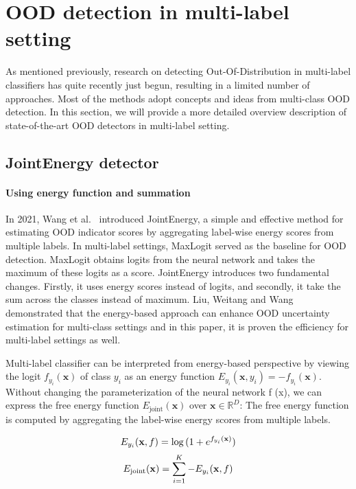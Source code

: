 \section{OOD detection in multi-label setting}
As mentioned previously, research on detecting Out-Of-Distribution in multi-label classifiers has quite recently just begun, 
resulting in a limited number of approaches. 
Most of the methods adopt concepts and ideas from multi-class OOD detection. 
In this section, we will provide a more detailed overview description of state-of-the-art OOD detectors in multi-label setting.

\subsection{JointEnergy detector}
\paragraph{Using energy function and summation}
In 2021, Wang et al.~\cite{Wang2021} introduced JointEnergy, a simple and effective method for estimating OOD indicator scores by aggregating label-wise energy scores from multiple labels. 
In multi-label settings, MaxLogit\cite{hendrycksScalingOutofDistributionDetection2022} served as the baseline for OOD detection. 
MaxLogit obtains logits from the neural network and takes the maximum of these logits as a score. 
JointEnergy introduces two fundamental changes. 
Firstly, it uses energy scores instead of logits, and secondly, it take the sum across the classes instead of maximum. 
Liu, Weitang and Wang~\cite{liuEnergybasedOutofdistributionDetection2021} demonstrated that the energy-based approach can enhance OOD uncertainty estimation for multi-class settings and in this paper, 
it is proven the efficiency for multi-label settings as well. 

Multi-label classifier can be interpreted from energy-based perspective by viewing the logit 
$f_{y_i}(\mathbf{x})$ of class $y_i$ as an energy function $E_{y_i}(\mathbf{x}, y_i) = - f_{y_i}(\mathbf{x})$. 
Without changing the parameterization of the neural network f (x), we can express the free energy function $E_{\text{joint}}(\mathbf{x})$ over $\mathbf{x} \in \mathbb{R}^D$:
The free energy function is computed by aggregating the label-wise energy scores from multiple labels.

\begin{equation}
\centering
E_{y_i}(\mathbf{x}, f) = \log{(1 + e^{f_{y_i}(\mathbf{x})})}
\end{equation}
\begin{equation}
\centering
E_{\text{joint}}(\mathbf{x}) = \sum_{i=1}^{K}{-E_{y_i}(\mathbf{x}, f)}
\end{equation}

